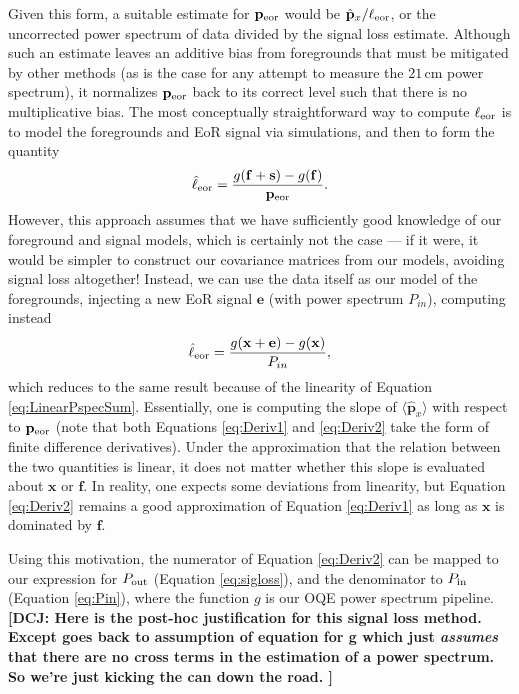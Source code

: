 \documentclass[preprint2,numberedappendix,tighten]{aastex6}  %
\newcommand{\x}{\mathbf{x}}
\newcommand{\f}{\mathbf{f}}
\newcommand{\s}{\mathbf{s}}
\newcommand{\e}{\mathbf{e}}
\newcommand{\p}{\mathbf{p}}
\newcommand{\phat}{\hat{\mathbf{p}}}
\newcommand{\dcj}[1]{{\color{orange} \textbf{[DCJ: #1]}}}
\begin{document}
Given this form, a suitable estimate for $\p_{\rm eor}$ would be $\phat_{x} / \ell_{\rm eor}$, or the uncorrected power spectrum of data divided by the signal loss estimate. Although such an estimate leaves an additive bias from foregrounds that must be mitigated by other methods (as is the case for any attempt to measure the $21\,\textrm{cm}$ power spectrum), it normalizes $\p_{\rm eor}$ back to its correct level such that there is no multiplicative bias. The most conceptually straightforward way to compute $\ell_{\rm eor}$ is to model the foregrounds and EoR signal via simulations, and then to form the quantity
\begin{equation}
\label{eq:Deriv1}
\hat{\ell}_{\rm eor} = \frac{g(\f + \s) - g(\f)}{\p_{\rm eor}}.
\end{equation}
However, this approach assumes that we have sufficiently good knowledge of our foreground and signal models, which is certainly not the case --- if it were, it would be simpler to construct our covariance matrices from our models, avoiding signal loss altogether! Instead, we can use the data itself as our model of the foregrounds, injecting a new EoR signal $\e$ (with power spectrum $P_{in}$), computing instead
\begin{equation}
\label{eq:Deriv2}
\hat{\ell}_{\rm eor} = \frac{g(\x+ \e) - g(\x)}{P_{in}},
\end{equation}
which reduces to the same result because of the linearity of Equation \eqref{eq:LinearPspecSum}. Essentially, one is computing the slope of $\langle \phat_{x} \rangle$ with respect to $\p_{\rm eor}$ (note that both Equations \eqref{eq:Deriv1} and \eqref{eq:Deriv2} take the form of finite difference derivatives). Under the approximation that the relation between the two quantities is linear, it does not matter whether this slope is evaluated about $\x$ or $\f$. In reality, one expects some deviations from linearity, but Equation \eqref{eq:Deriv2} remains a good approximation of Equation \eqref{eq:Deriv1} as long as $\x$ is dominated by $\f$. 

Using this motivation, the numerator of Equation \eqref{eq:Deriv2} can be mapped to our expression for $P_{\rm out}$ (Equation \eqref{eq:sigloss}), and the denominator to $P_{\rm in}$ (Equation \eqref{eq:Pin}), where the function $g$ is our OQE power spectrum pipeline. \dcj{Here is the post-hoc justification for this signal loss method.  Except goes back to assumption of equation for g which just \emph{assumes} that there are no cross terms in the estimation of a power spectrum. So we're just kicking the can down the road. }
\end{document}
